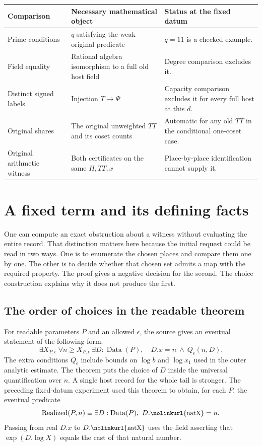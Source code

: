 \documentclass[12pt,letterpaper]{article}
\newcommand{\id}[1]{\ifmmode\text{\small\nolinkurl{#1}}\else{\small\nolinkurl{#1}}\fi}
\begin{document}
\begin{center}
\small
\begin{tabularx}{\linewidth}{@{}p{.23\linewidth}YY@{}}\toprule
Comparison & Necessary mathematical object & Status at the fixed datum\\\midrule
Prime conditions & $q$ satisfying the weak original predicate & $q=11$ is a checked example.\\
Field equality & Rational algebra isomorphism to a full old host field & Degree comparison excludes it.\\
Distinct signed labels & Injection $T\to\Psi$ & Capacity comparison excludes it for every full host at this $d$.\\
Original shares & The original unweighted $TT$ and its coset counts & Automatic for any old $TT$ in the conditional one-coset case.\\
Original arithmetic witness & Both certificates on the same $H,TT,x$ & Place-by-place identification cannot supply it.\\\bottomrule
\end{tabularx}
\end{center}


\section{A fixed term and its defining facts}\label{sec:choice}
One can compute an exact obstruction about a witness without evaluating the entire record. That distinction matters here because the initial request could be read in two ways. One is to enumerate the chosen places and compare them one by one. The other is to decide whether that chosen set admits a map with the required property. The proof gives a negative decision for the second. The choice construction explains why it does not produce the first.

\subsection{The order of choices in the readable theorem}
For readable parameters $P$ and an allowed $\epsilon$, the source gives an eventual statement of the following form:
\[
  \exists X_{P,\epsilon}\ \forall n\ge X_{P,\epsilon}\ 
  \exists D:\operatorname{Data}(P),\quad
  D.x=n\ \wedge\ Q_\epsilon(n,D).
\]
The extra conditions $Q_\epsilon$ include bounds on $\log b$ and $\log x_1$ used in the outer analytic estimate. The theorem puts the choice of $D$ inside the universal quantification over $n$. A single host record for the whole tail is stronger. The preceding fixed-datum experiment used this theorem to obtain, for each $P$, the eventual predicate
\[
                       \operatorname{Realized}(P,n)
             \equiv \exists D:\operatorname{Data}(P),\ D.\id{natX}=n .
\]
Passing from real $D.x$ to $D.\id{natX}$ uses the field asserting that $\exp(D.\log X)$ equals the cast of that natural number.
\end{document}
